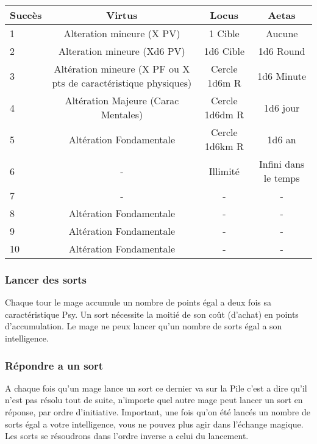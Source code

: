 \begin{center}
\begin{tabular}{|l| |c|c|c|}
    \hline
    Succès & Virtus & Locus & Aetas\\
    \hline
    \hline
    1      & Alteration mineure (X PV)                               & 1 Cible           & Aucune \\
    2      & Alteration mineure (Xd6 PV)                             & 1d6 Cible         & 1d6 Round \\
    3      & Altération mineure (X PF ou X pts de caractéristique physiques) & Cercle 1d6m R     &   1d6 Minute\\
    4      & Altération Majeure (Carac Mentales)& Cercle 1d6dm R    &   1d6 jour\\
    5      & Altération Fondamentale            & Cercle 1d6km R    & 1d6 an\\  
    6      &  -                                 & Illimité          &  Infini dans le temps\\
    7      & - & - &- \\
    8      & Altération Fondamentale & - & -\\
    9      & Altération Fondamentale & - & - \\
    10     & Altération Fondamentale &- &-\\
    \hline
\end{tabular}
\end{center}
\subsubsection{Lancer des sorts}
Chaque tour le mage accumule un nombre de points égal a deux fois sa caractéristique Psy. 
Un sort nécessite la moitié de son coût (d’achat) en points d’accumulation. 
Le mage ne peux lancer qu’un nombre de sorts égal a son intelligence.

\subsubsection{Répondre a un sort}
A chaque fois qu’un mage lance un sort ce dernier va sur la Pile c’est a dire qu’il n’est pas résolu tout de suite, 
n'importe quel autre mage peut lancer un sort en réponse, par ordre d’initiative.
Important, une fois qu’on été lancés un nombre de sorts égal a votre intelligence, vous ne pouvez plus agir dans l'échange magique.
Les sorts se résoudrons dans l’ordre inverse a celui du lancement.

